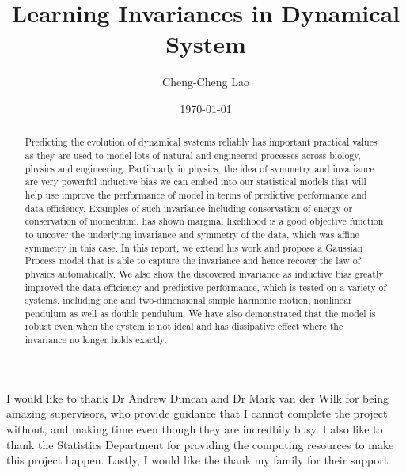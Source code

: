 \documentclass{statsmsc}
\title{Learning Invariances in Dynamical System}
\author{Cheng-Cheng Lao}
\date{\today}
\begin{document}
\maketitle


\declarationdate{\today}
\declaration 


\begin{abstract}
Predicting the evolution of dynamical systems reliably has important practical values as they are used to model lots of natural and engineered processes across biology, physics and engineering.
Particuarly in physics, the idea of symmetry and invariance are very powerful inductive bias we can embed into our statistical models that will help use improve the performance of model in terms of predictive performance and data efficiency.
Examples of such invariance including conservation of energy or conservation of momentum.
\cite{Mark2017} has shown marginal likelihood is a good objective function to uncover the underlying invariance and symmetry of the data, which was affine symmetry in this case. 
In this report, we extend his work and propose a Gaussian Process model that is able to capture the invariance and hence recover the law of physics automatically.
We also show the discovered invariance as inductive bias greatly improved the data efficiency and predictive performance, which is tested on a variety of systems, including one and two-dimensional simple harmonic motion, nonlinear pendulum as well as double pendulum.
We have also demonstrated that the model is robust even when the system is not ideal and has dissipative effect where the invariance no longer holds exactly. 
\end{abstract}

\begin{acknowledgements}
I would like to thank Dr Andrew Duncan and Dr Mark van der Wilk for being amazing supervisors, who provide guidance that I cannot complete the project without, and making time even though they are incredbily busy. 
I also like to thank the Statistics Department for providing the computing resources to make this project happen.
Lastly, I would like the thank my family for their support.

\end{acknowledgements}


\mainmatter
\tableofcontents
\end{document}

